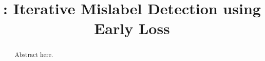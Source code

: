 \documentclass[sigconf, anonymous]{acmart}
\begin{document}
\title{\sys: Iterative Mislabel Detection using Early Loss}

\renewcommand{\shortauthors}{Trovato et al.}

\begin{abstract}
Abstract here.
\end{abstract}

\maketitle












\normalem


\end{document}
